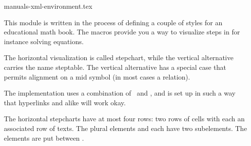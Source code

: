 
%
%

\environment manuals-xml-environment.tex

\useMPlibrary [ove]

\usemodule[x][mathml]
\usemodule[m][steps]

\startdocument[title=Steps,author=Hans Hagen,palet=steps]

\startbuffer
\startSTEPchart
{}
   
   
 
  
\stopSTEPchart
\stopbuffer

\startsection[title=Description]

This module is written in the process of defining a couple of styles for an
educational math book. The macros provide you a way to visualize steps in for
instance solving equations.

The horizontal visualization is called stepchart, while the vertical alternative
carries the name steptable. The vertical alternative has a special case that
permits alignment on a mid symbol (in most cases a relation).

The implementation uses a combination of \TEX\ and \METAPOST, and is set up in
such a way that hyperlinks and alike will work okay.

\stopsection

\startsection[title=Structure]

The horizontal stepcharts have at most four rows: two rows of cells with each an
associated row of texts. The plural elements  and  each
have two subelements. The  elements are put between .

